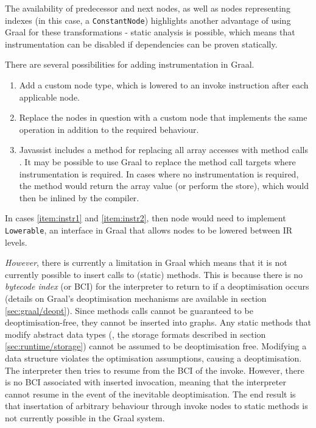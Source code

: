 	The availability of predecessor and next nodes, as well as nodes representing indexes (in this case, a \texttt{ConstantNode}) highlights another advantage of using Graal for these transformations - static analysis is possible, which means that instrumentation can be disabled if dependencies can be proven statically. 
	
	There are several possibilities for adding instrumentation in Graal.
	
	\begin{enumerate}
		\item \label{item:instr1} Add a custom node type, which is lowered to an invoke instruction after each applicable node.
	
		\item \label{item:instr2} Replace the nodes in question with a custom node that implements the same operation in addition to the required behaviour.
	
		\item \label{item:instr3} Javassist includes a method for replacing all array accesses with method calls \citep{JavassistDocs}. It may be possible to use Graal to replace the method call targets where instrumentation is required. In cases where no instrumentation is required, the method would return the array value (or perform the store), which would then be inlined by the compiler.
	\end{enumerate}
	
	In cases \ref{item:instr1} and \ref{item:instr2}, then node would need to implement \texttt{Lowerable}, an interface in Graal that allows nodes to be lowered between IR levels.
	
	\textit{However}, there is currently a limitation in Graal which means that it is not currently possible to insert calls to (static) methods. This is because there is no \emph{bytecode index} (or BCI) for the interpreter to return to if a deoptimisation occurs (details on Graal's deoptimisation mechanisms are available in section \ref{sec:graal/deopt}). Since methods calls cannot be guaranteed to be deoptimisation-free, they cannot be inserted into graphs. Any static methods that modify abstract data types (\ie, the storage formats described in section \ref{sec:runtime/storage}) cannot be assumed to be deoptimisation free. Modifying a data structure violates the optimisation assumptions, causing a deoptimisation. The interpreter then tries to resume from the BCI of the invoke. However, there is no BCI associated with inserted invocation, meaning that the interpreter cannot resume in the event of the inevitable deoptimisation. The end result is that insertation of arbitrary behaviour through invoke nodes to static methods is not currently possible in the Graal system.
	
